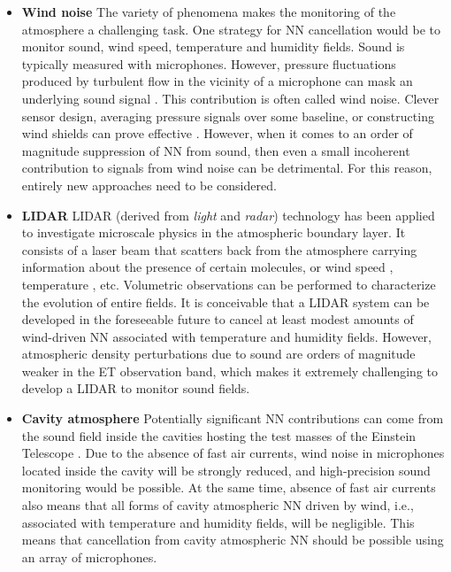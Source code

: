 \begin{itemize}
\item {\bf Wind noise}\; The variety of phenomena makes the monitoring of the atmosphere a challenging task. One strategy for NN cancellation would be to monitor sound, wind speed, temperature and humidity fields. Sound is typically measured with microphones. However, pressure fluctuations produced by turbulent flow in the vicinity of a microphone can mask an underlying sound signal \cite{Gre2015}. This contribution is often called wind noise. Clever sensor design, averaging pressure signals over some baseline, or constructing wind shields can prove effective \cite{Ell1972,WaHe2009,NoEA2014}. However, when it comes to an order of magnitude suppression of NN from sound, then even a small incoherent contribution to signals from wind noise can be detrimental. For this reason, entirely new approaches need to be considered. 

\item {\bf LIDAR}\; LIDAR (derived from \emph{light} and \emph{radar}) technology has been applied to investigate microscale physics in the atmospheric boundary layer. It consists of a laser beam that scatters back from the atmosphere carrying information about the presence of certain molecules, or wind speed \cite{CLN2004}, temperature \cite{Beh2005}, etc. Volumetric observations can be performed to characterize the evolution of entire fields. It is conceivable that a LIDAR system can be developed in the foreseeable future to cancel at least modest amounts of wind-driven NN associated with temperature and humidity fields. However, atmospheric density perturbations due to sound are orders of magnitude weaker in the ET observation band, which makes it extremely challenging to develop a LIDAR to monitor sound fields.

\item {\bf Cavity atmosphere}\; Potentially significant NN contributions can come from the sound field inside the cavities hosting the test masses of the Einstein Telescope \cite{FiEA2018}. Due to the absence of fast air currents, wind noise in microphones located inside the cavity will be strongly reduced, and high-precision sound monitoring would be possible. At the same time, absence of fast air currents also means that all forms of cavity atmospheric NN driven by wind, i.e., associated with temperature and humidity fields, will be negligible. This means that cancellation from cavity atmospheric NN should be possible using an array of microphones.
\end{itemize}

